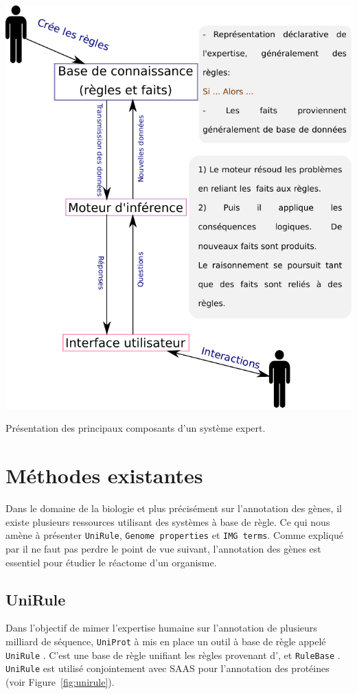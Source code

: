 \begin{refsegment}
    \begin{shadedfigure}[H]
        \centering
        \includegraphics[width=\textwidth]{img/systeme_expert.pdf}
        \caption{Présentation des principaux composants d'un système expert.}
        \label{fig:systeme_expert}
    \end{shadedfigure}
    
    \section{Méthodes existantes}
    
    Dans le domaine de la biologie et plus précisément sur l'annotation des gènes, il existe plusieurs ressources utilisant des systèmes à base de règle. Ce qui nous amène à présenter \texttt{UniRule}, \texttt{Genome properties} et \texttt{IMG terms}. Comme expliqué par \citeauthor{dale2010machine}\cite{dale2010machine} il ne faut pas perdre le point de vue suivant, l'annotation des gènes est essentiel pour étudier le réactome d'un organisme.
    
    \subsection{UniRule}
    Dans l'objectif de mimer l'expertise humaine sur l'annotation de plusieurs milliard de séquence, \texttt{UniProt} à mis en place un outil à base de règle appelé \texttt{UniRule} \cite{unirule2015,bridge2010unirule}. C'est une base de règle unifiant les règles provenant d'\texttt{}, \texttt{} et \texttt{RuleBase} . \texttt{UniRule} est utilisé conjointement avec \acrfull{SAAS} \cite{kretschmann2001automatic,uniprot2015} pour l'annotation des protéines (voir Figure~\cref{fig:unirule}).
    

\end{refsegment}
